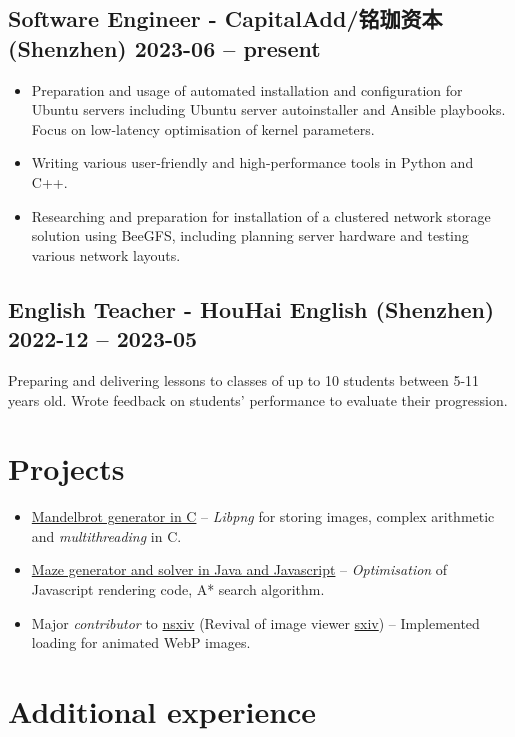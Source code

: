 \subsection{Software Engineer - CapitalAdd/铭珈资本 (Shenzhen) \hfill 2023-06 --
present}
\begin{itemize}
    \item Preparation and usage of automated installation and configuration for
        Ubuntu servers including Ubuntu server autoinstaller and Ansible
        playbooks. Focus on low-latency optimisation of kernel parameters.
    \item Writing various user-friendly and high-performance tools in Python
        and C++.
    \item Researching and preparation for installation of a clustered network
        storage solution using BeeGFS, including planning server hardware and
        testing various network layouts.
\end{itemize}

\subsection{English Teacher - HouHai English (Shenzhen) \hfill 2022-12 --
2023-05}
Preparing and delivering lessons to classes of up to 10 students between
5-11 years old. Wrote feedback on students' performance to evaluate their
progression.

\section{Projects}
        \begin{itemize}
            \item \href{https://github.com/Ytrewq13/mandelbrotc}{Mandelbrot generator in C}
    -- \emph{Libpng} for storing images, complex arithmetic and
    \emph{multithreading} in C.
            \item \href{https://github.com/Ytrewq13/mazemaker.git}{Maze generator and solver in Java and Javascript}
    -- \emph{Optimisation} of Javascript rendering code, A* search algorithm.
            \item Major \emph{contributor} to
                \href{https://github.com/nsxiv/nsxiv.git}{nsxiv} (Revival of
                image viewer \href{https://github.com/muennich/sxiv}{sxiv})
    -- Implemented loading for animated WebP images.
        \end{itemize}
\section{Additional experience}
